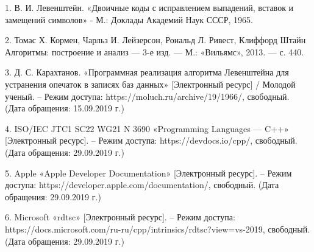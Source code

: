 \documentclass[a4paper, 14pt]{article}
\begin{document}
	\newpage
	
	\begin{thebibliography}{9}
		 1.	В. И. Левенштейн. «Двоичные коды с исправлением выпадений, вставок и замещений символов» - М.: Доклады Академий Наук СССР, 1965.
		
		 2. Томас Х. Кормен, Чарльз И. Лейзерсон, Рональд Л. Ривест, Клиффорд Штайн Алгоритмы: построение и анализ — 3-е изд. — М.: «Вильямс», 2013. — с. 440.
		
		 3.	Д. С. Карахтанов. «Программная реализация алгоритма Левенштейна для устранения опечаток в записях баз данных» [Электронный ресурс] / Молодой ученый. 	
		– Режим доступа: https://moluch.ru/archive/19/1966/, свободный. (Дата обращения: 15.09.2019 г.)
		
		 4.	ISO/IEC JTC1 SC22 WG21 N 3690 «Programming Languages — C++»  [Электронный ресурс].
		– Режим доступа: https://devdocs.io/cpp/, свободный. (Дата обращения: 29.09.2019 г.)
		
		 5.	Apple «Apple Developer Documentation»  [Электронный ресурс].
		– Режим доступа: https://developer.apple.com/documentation/, свободный. (Дата обращения: 29.09.2019 г.)
		
		 6.	Microsoft «rdtsc»  [Электронный ресурс].
		– Режим доступа: https://docs.microsoft.com/ru-ru/cpp/intrinsics/rdtsc?view=vs-2019, свободный. (Дата обращения: 29.09.2019 г.)
	\end{thebibliography}
	
\end{document}
